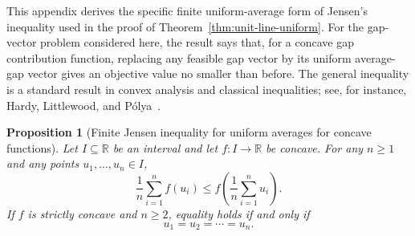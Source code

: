 \documentclass[12pt,a4paper]{article}
\newtheorem{proposition}{Proposition}
\begin{document}
This appendix derives the specific finite uniform-average form of Jensen's inequality used in the proof of Theorem~\ref{thm:unit-line-uniform}.  For the gap-vector problem considered here, the result says that, for a concave gap contribution function, replacing any feasible gap vector by its uniform average-gap vector gives an objective value no smaller than before.  The general inequality is a standard result in convex analysis and classical inequalities; see, for instance, Hardy, Littlewood, and P\'olya~\cite{HardyLittlewoodPolya1952}.

\begin{proposition}[Finite Jensen inequality for uniform averages for concave functions]
Let $I\subseteq\mathbb{R}$ be an interval and let $f:I\to\mathbb{R}$ be concave.  For any $n\geq 1$ and any points $u_1,\ldots,u_n\in I$,
\[
  \frac{1}{n}\sum_{i=1}^n f(u_i)
  \leq
  f\!\left(\frac{1}{n}\sum_{i=1}^n u_i\right).
\]
If $f$ is strictly concave and $n\geq2$, equality holds if and only if
\[
  u_1=u_2=\cdots=u_n.
\]
\end{proposition}
\end{document}
